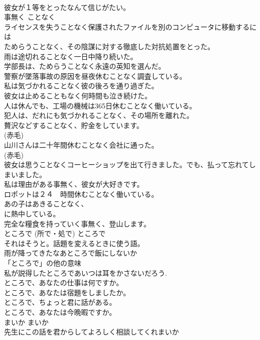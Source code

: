 \documentclass[8pt]{extreport}
\begin{document}
\begin{CJK}{UTF8}{min}
\\	彼女が１等をとったなんて信じがたい。  
\\	事無く	ことなく	
\\	ライセンスを失うことなく保護されたファイルを別のコンピュータに移動するには  
\\	ためらうことなく、その陰謀に対する徹底した対抗処置をとった。  
\\	雨は途切れることなく一日中降り続いた。  
\\	学部長は、ためらうことなく永遠の英知を選んだ。  
\\	警察が墜落事故の原因を昼夜休むことなく調査している。  
\\	私は気づかれることなく彼の後ろを通り過ぎた。  
\\	彼女は止めることもなく何時間も泣き続けた。  
\\	人は休んでも、工場の機械は365日休むことなく働いている。  
\\	犯人は、だれにも気づかれることなく、その場所を離れた。  
\\	贅沢などすることなく、貯金をしています。  
\\	(赤毛)
\\	山川さんは二十年間休むことなく会社に通った。  
\\	(赤毛)
\\	彼女は思うことなくコーヒーショップを出て行きました。でも、払って忘れてしまいました。  
\\	私は理由がある事無く、彼女が大好きです。  
\\	ロポットは２４　時間休むことなく働いている。  
\\	あの子はあきることなく、
\\	に熱中している。  
\\	完全な糧食を持っていく事無く、登山します。   
\\	ところで (所で・処で)	ところで	
\\	それはそうと。話題を変えるときに使う語。	
\\	雨が降ってきたなあところで飯にしないか  
\\	「ところで」の他の意味 
\\	私が説得したところであいつは耳をかさないだろう.  
\\	ところで、あなたの仕事は何ですか。
\\	ところで、あなたは宿題をしましたか。  
\\	ところで、ちょっと君に話がある。
\\	ところで、あなたは今晩暇ですか。
\\	まいか	まいか	
\\	先生にこの話を君からしてよろしく相談してくれまいか  

\end{CJK}
\end{document}
